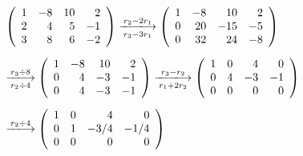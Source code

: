 \begin{frame}
\begin{jie}
$$
\begin{array}{l}
  \left(
  \begin{array}{rrrr}
    1&-8&10&2\\
    2&4&5&-1\\
    3&8&6&-2
  \end{array}
           \right) \xlongrightarrow[r_3-3r_1]{r_2-2r_1}
           \left(
           \begin{array}{rrrr}
             1&-8&10&2\\
             0&20&-15&-5\\
             0&32&24&-8
           \end{array}
                      \right)\\[0.3in]
  \xlongrightarrow[r_2\div4]{r_3\div8}
  \left(
  \begin{array}{rrrr}
    1&-8&10&2\\
    0&4&-3&-1\\
    0&4&-3&-1
  \end{array}
            \right) \xlongrightarrow[r_1+2r_2]{r_3-r_2}
            \left(
            \begin{array}{rrrr}
              1&0&4&0\\
              0&4&-3&-1\\
              0&0&0&0
            \end{array}
                     \right) \\[0.3in]
  \xlongrightarrow[]{r_2\div4}
  \left(
  \begin{array}{rrrr}
    1&0&4&0\\
    0&1&-3/4&-1/4\\
    0&0&0&0
  \end{array}
           \right)
\end{array}
$$
\end{jie}
\end{frame}

